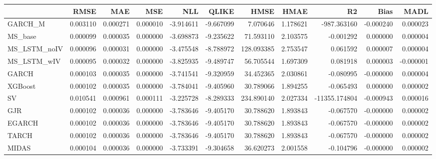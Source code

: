 \begin{tabular}{lrrrrrrrrrr}
\toprule
 & RMSE & MAE & MSE & NLL & QLIKE & HMSE & HMAE & R2 & Bias & MADL \\
\midrule
GARCH_M & 0.003110 & 0.000271 & 0.000010 & -3.914611 & -9.667099 & 7.070646 & 1.178621 & -987.363160 & -0.000240 & 0.000023 \\
MS_base & 0.000099 & 0.000035 & 0.000000 & -3.698873 & -9.235622 & 71.593110 & 2.103575 & -0.001292 & 0.000000 & 0.000004 \\
MS_LSTM_noIV & 0.000096 & 0.000031 & 0.000000 & -3.475548 & -8.788972 & 128.093385 & 2.753547 & 0.061592 & 0.000007 & 0.000004 \\
MS_LSTM_wIV & 0.000095 & 0.000032 & 0.000000 & -3.825935 & -9.489747 & 56.705544 & 1.697309 & 0.081918 & 0.000003 & -0.000001 \\
GARCH & 0.000103 & 0.000035 & 0.000000 & -3.741541 & -9.320959 & 34.452365 & 2.030861 & -0.080995 & -0.000000 & 0.000004 \\
XGBoost & 0.000102 & 0.000035 & 0.000000 & -3.784041 & -9.405960 & 30.789066 & 1.894255 & -0.065493 & 0.000000 & 0.000002 \\
SV & 0.010541 & 0.000961 & 0.000111 & -3.225728 & -8.289333 & 234.890140 & 2.027334 & -11355.174804 & -0.000943 & 0.000016 \\
GJR & 0.000102 & 0.000036 & 0.000000 & -3.783646 & -9.405170 & 30.788620 & 1.893843 & -0.067570 & -0.000000 & 0.000002 \\
EGARCH & 0.000102 & 0.000036 & 0.000000 & -3.783646 & -9.405170 & 30.788620 & 1.893843 & -0.067570 & -0.000000 & 0.000002 \\
TARCH & 0.000102 & 0.000036 & 0.000000 & -3.783646 & -9.405170 & 30.788620 & 1.893843 & -0.067570 & -0.000000 & 0.000002 \\
MIDAS & 0.000104 & 0.000036 & 0.000000 & -3.733391 & -9.304658 & 36.620273 & 2.001558 & -0.104796 & -0.000000 & 0.000002 \\
\bottomrule
\end{tabular}
